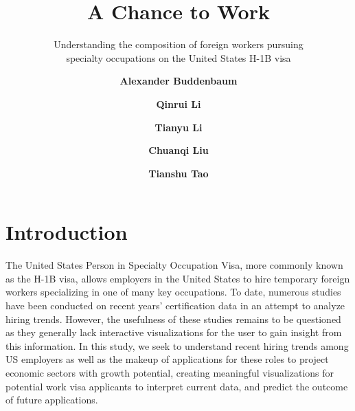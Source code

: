 \documentclass[sigconf]{acmart}
\begin{document}
\title{A Chance to Work}
\subtitle{Understanding the composition of foreign workers 
pursuing \\specialty occupations on the United States H-1B visa
}


\author{\textbf{Alexander Buddenbaum}}

\author{\textbf{Qinrui Li}}

\author{\textbf{Tianyu Li}}


\author{\textbf{Chuanqi Liu}}

\author{\textbf{Tianshu Tao}}



\maketitle
\pagestyle{plain}
\section{Introduction}


The United States Person in Specialty Occupation Visa, more commonly known as the H-1B visa, 
allows employers in the United States to hire temporary foreign workers specializing in one of many key occupations.  
To date, numerous studies have been conducted on recent years’ certification data in an attempt to analyze hiring trends. 
However, the usefulness of these studies remains to be questioned as they generally lack interactive visualizations for the user to gain 
insight from this information. In this study, we seek to understand recent hiring trends among US employers as well as the makeup of 
applications for these roles to project economic sectors with growth potential, creating meaningful visualizations for potential work 
visa applicants to interpret current data, and predict the outcome of future applications.
\end{document}
